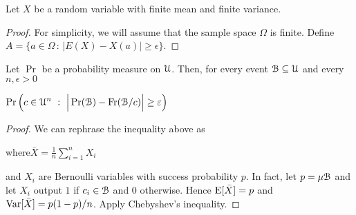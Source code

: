 \documentclass[sputnik.tex]{subfiles}
\begin{document}
\begin{void_thm}\label{Chebyshev}
Let $X$ be a random variable with finite mean and finite variance.

\end{void_thm}

\begin{proof}
For simplicity, we will assume that the sample space $\Omega$ is finite. Define $A=\{a\in\Omega\,:\, |E(X)-X(a)|\ge\epsilon\}$.





\end{proof}

\begin{void_thm}\label{prop_wlln}
\def\ceq#1#2#3{\parbox[t]{45ex}{$\displaystyle #1$}\medrel{#2}{$\displaystyle #3$}}
Let $\Pr$ be a probability measure on $\EuScript U$.
Then, for every event $\EuScript B\subseteq\EuScript U$ and every $n,\epsilon>0$

\ceq{\hfill\Pr \Big(c\in\U^n\ :\ \Big|\Pr(\B) - \Fr(\B/c) \Big|\ge\epsilon\Big)}{\le}{\frac{1}{4n\epsilon^{\scriptscriptstyle 2}}}

\end{void_thm}


\begin{proof}
We can rephrase the inequality above as

\hfill where\quad$\displaystyle\bar X=\frac1n\sum^n_{i=1}X_i$

and $X_i$ are Bernoulli variables with success probability $p$. In fact, let $p=\mu\EuScript B$ and let $X_i$ output $1$ if $c_i\in\EuScript B$ and $0$ otherwise.
Hence ${\rm E}[\bar X]=p$ and  ${\rm Var}[\bar X]=p(1-p)/n$.
Apply Chebyshev's inequality.
\end{proof}
\end{document}
